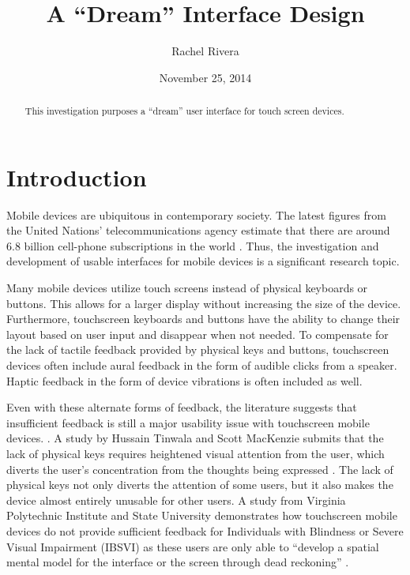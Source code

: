 \documentclass[11pt]{article}
\title{A ``Dream'' Interface Design}
\author{Rachel Rivera}
\date{November 25, 2014}
\begin{document}
\maketitle


\begin{abstract}
This investigation purposes a ``dream'' user interface for touch screen devices. 
\end{abstract}


\pagebreak
\tableofcontents



\pagebreak


\section{Introduction}
\label{Introduction}

Mobile devices are ubiquitous in contemporary society. The latest figures from the United Nations' telecommunications agency estimate that there are around 6.8 billion cell-phone subscriptions in the world \cite{UNTelecommunications	}. Thus, the investigation and development of usable interfaces for mobile devices is a significant research topic.

Many mobile devices utilize touch screens instead of physical keyboards or buttons. This allows for a larger display without increasing the size of the device. Furthermore, touchscreen keyboards and buttons have the ability to change their layout based on user input and disappear when not needed. To compensate for the lack of tactile feedback provided by physical keys and buttons, touchscreen devices often include aural feedback in the form of audible clicks from a speaker. Haptic feedback in the form of device vibrations is often included as well.

Even with these alternate forms of feedback, the literature suggests that insufficient feedback is still a major usability issue with touchscreen mobile devices. \cite{Tinwala:2010:ETE:18	68914.1868972, Kane:2011:UGB:1978942.1979001, Hardy:2008:TIT:1409240.1409267, El-Glaly:2013:TTF:2460625.2460665, Buxton:1986:HID:22339.22386}. A study by Hussain Tinwala and Scott MacKenzie submits that the lack of physical keys requires heightened visual attention from the user, which diverts the user's concentration from the thoughts being expressed \cite{Tinwala:2010:ETE:18 68914.1868972}. The lack of physical keys not only diverts the attention of some users, but it also makes the device  almost entirely unusable for other users. A study from Virginia Polytechnic Institute and State University demonstrates how touchscreen mobile devices do not provide sufficient feedback for Individuals with Blindness or Severe Visual Impairment (IBSVI) as these users are only able to ``develop a spatial mental model for the interface or the screen through dead reckoning'' \cite{El-Glaly:2013:TTF:2460625.2460665}. 
\end{document}
